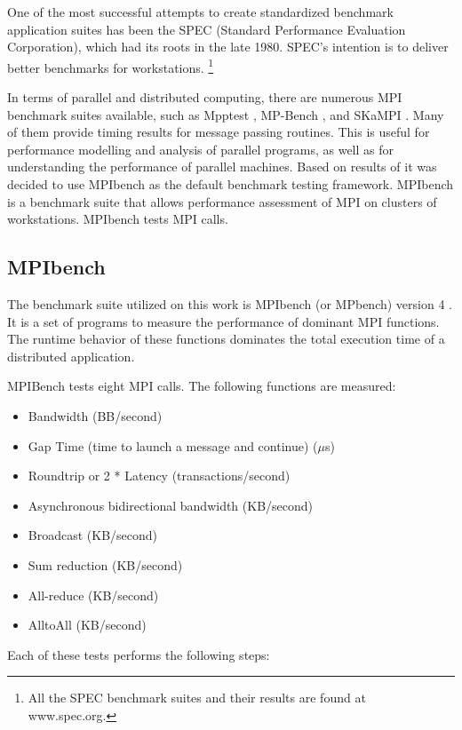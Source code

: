One of the most successful attempts to create standardized benchmark
application suites has been the SPEC (Standard Performance Evaluation
Corporation), which had its roots in the late 1980. SPEC's intention is to deliver better
benchmarks for workstations. \footnote{All the SPEC benchmark suites and
their results are found at www.spec.org.}

In terms of parallel and distributed computing, there are numerous MPI
benchmark suites available, such as Mpptest \cite{Gropp}, MP-Bench
\cite{Calderon}, and  SKaMPI \cite{Hoefler}. Many of them provide timing
results for message passing routines. This is useful for performance modelling
and analysis of parallel programs, as well as for understanding the performance
of parallel machines. Based on results of \cite{Grove} it was decided to use
MPIbench as the default benchmark testing framework. MPIbench is a benchmark
suite that allows performance assessment of MPI on clusters of
workstations. MPIbench tests MPI calls.

\subsection{MPIbench}
\noindent

The benchmark suite utilized on this work is MPIbench (or MPbench) version 4
\cite{mpibench}. It is a set of programs to measure the performance of dominant
MPI functions. The runtime behavior of these functions dominates the total
execution time of a distributed application.


MPIBench tests eight MPI calls. The following functions are
measured:

\begin{itemize}
    \item Bandwidth (BB/second)
    \item Gap Time (time to launch a message and continue) ($\mu$s)
    \item Roundtrip or 2 * Latency (transactions/second)
    \item Asynchronous bidirectional bandwidth (KB/second)
    \item Broadcast (KB/second)
    \item Sum reduction (KB/second)
    \item All-reduce (KB/second)
    \item AlltoAll (KB/second)
\end{itemize}

Each of these tests performs the following steps:

